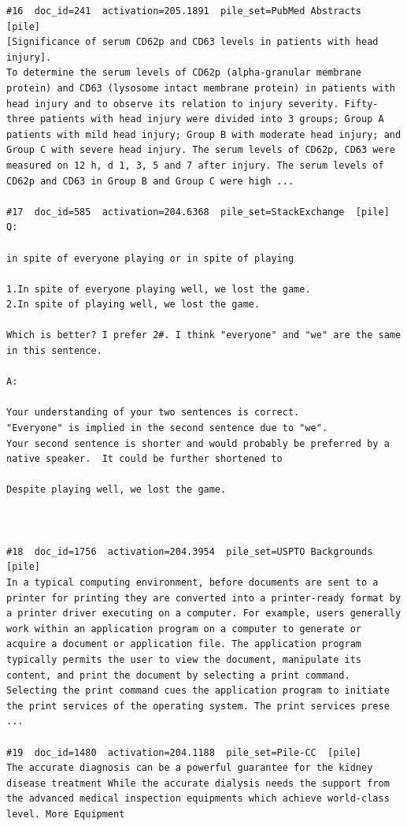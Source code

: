 \begin{verbatim}
#16  doc_id=241  activation=205.1891  pile_set=PubMed Abstracts  [pile]
[Significance of serum CD62p and CD63 levels in patients with head injury].
To determine the serum levels of CD62p (alpha-granular membrane protein) and CD63 (lysosome intact membrane protein) in patients with head injury and to observe its relation to injury severity. Fifty-three patients with head injury were divided into 3 groups; Group A patients with mild head injury; Group B with moderate head injury; and Group C with severe head injury. The serum levels of CD62p, CD63 were measured on 12 h, d 1, 3, 5 and 7 after injury. The serum levels of CD62p and CD63 in Group B and Group C were high ...

#17  doc_id=585  activation=204.6368  pile_set=StackExchange  [pile]
Q:

in spite of everyone playing or in spite of playing

1.In spite of everyone playing well, we lost the game.
2.In spite of playing well, we lost the game.

Which is better? I prefer 2#. I think "everyone" and "we" are the same in this sentence.

A:

Your understanding of your two sentences is correct.
"Everyone" is implied in the second sentence due to "we".
Your second sentence is shorter and would probably be preferred by a native speaker.  It could be further shortened to

Despite playing well, we lost the game.



#18  doc_id=1756  activation=204.3954  pile_set=USPTO Backgrounds  [pile]
In a typical computing environment, before documents are sent to a printer for printing they are converted into a printer-ready format by a printer driver executing on a computer. For example, users generally work within an application program on a computer to generate or acquire a document or application file. The application program typically permits the user to view the document, manipulate its content, and print the document by selecting a print command. Selecting the print command cues the application program to initiate the print services of the operating system. The print services prese ...

#19  doc_id=1480  activation=204.1188  pile_set=Pile-CC  [pile]
The accurate diagnosis can be a powerful guarantee for the kidney disease treatment While the accurate dialysis needs the support from the advanced medical inspection equipments which achieve world-class level. More Equipment


\end{verbatim}
